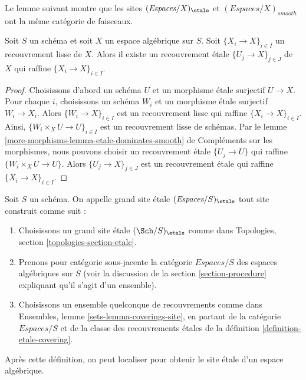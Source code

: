 \noindent
Le lemme suivant montre que les sites
$(\textit{Espaces}/X)_\etale$ et $(\textit{Espaces}/X)_{smooth}$
ont la même catégorie de faisceaux.

\begin{lemma}
\label{lemma-etale-dominates-smooth}
Soit $S$ un schéma et soit $X$ un espace algébrique sur $S$.
Soit $\{X_i \to X\}_{i \in I}$ un recouvrement lisse de $X$.
Alors il existe un recouvrement \'etale $\{U_j \to X\}_{j \in J}$
de $X$ qui raffine $\{X_i \to X\}_{i \in I}$.
\end{lemma}

\begin{proof}
Choisissons d'abord un schéma $U$ et un morphisme \'etale surjectif $U \to X$.
Pour chaque $i$, choisissons un schéma $W_i$ et un morphisme \'etale surjectif
$W_i \to X_i$. Alors $\{W_i \to X\}_{i \in I}$ est un recouvrement lisse
qui raffine $\{X_i \to X\}_{i \in I}$. Ainsi,
$\{W_i \times_X U \to U\}_{i \in I}$ est un recouvrement lisse de schémas.
Par le lemme \ref{more-morphisms-lemma-etale-dominates-smooth} de Compléments sur les morphismes,
nous pouvons choisir un recouvrement \'etale $\{U_j \to U\}$ qui raffine
$\{W_i \times_X U \to U\}$. Alors $\{U_j \to X\}_{j \in J}$
est un recouvrement \'etale qui raffine $\{X_i \to X\}_{i \in I}$.
\end{proof}

\begin{definition}
\label{definition-big-etale-site}
Soit $S$ un schéma. On appelle grand site \'etale
{\it $(\textit{Espaces}/S)_\etale$} tout site construit comme suit :
\begin{enumerate}
\item Choisissons un grand site \'etale $(\Sch/S)_\etale$ comme dans
Topologies, section \ref{topologies-section-etale}.
\item Prenons pour catégorie sous-jacente la catégorie $\textit{Espaces}/S$
des espaces algébriques sur $S$ (voir la discussion de la
section \ref{section-procedure} expliquant qu'il s'agit d'un ensemble).
\item Choisissons un ensemble quelconque de recouvrements comme dans
Ensembles, lemme \ref{sets-lemma-coverings-site}, en partant de la
catégorie $\textit{Espaces}/S$ et de la classe des recouvrements \'etales
de la définition \ref{definition-etale-covering}.
\end{enumerate}
\end{definition}

\noindent
Après cette définition, on peut localiser pour obtenir le site \'etale
d'un espace algébrique.

